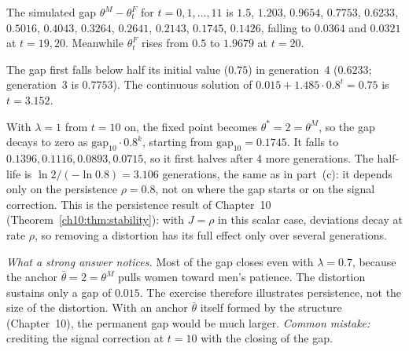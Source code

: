 \documentclass[../solutions_manual.tex]{subfiles}
\begin{document}
 The simulated gap $\theta^M - \theta^F_t$ for $t = 0, 1, \ldots, 11$ is $1.5$, $1.203$, $0.9654$, $0.7753$, $0.6233$, $0.5016$, $0.4043$, $0.3264$, $0.2641$, $0.2143$, $0.1745$, $0.1426$, falling to $0.0364$ and $0.0321$ at $t = 19, 20$. Meanwhile $\theta^F_t$ rises from $0.5$ to $1.9679$ at $t = 20$.
\begin{center}
\end{center}

 The gap first falls below half its initial value ($0.75$) in generation~4 ($0.6233$; generation~3 is $0.7753$). The continuous solution of $0.015 + 1.485\cdot0.8^t = 0.75$ is $t = 3.152$.

 With $\lambda = 1$ from $t = 10$ on, the fixed point becomes $\theta^* = 2 = \theta^M$, so the gap decays to zero as $\text{gap}_{10}\cdot0.8^{k}$, starting from $\text{gap}_{10} = 0.1745$. It falls to $0.1396, 0.1116, 0.0893, 0.0715$, so it first halves after 4 more generations. The half-life is $\ln2/(-\ln 0.8) = 3.106$ generations, the same as in part~(c): it depends only on the persistence $\rho = 0.8$, not on where the gap starts or on the signal correction. This is the persistence result of Chapter~10 (Theorem~\ref{ch10:thm:stability}): with $J = \rho$ in this scalar case, deviations decay at rate $\rho$, so removing a distortion has its full effect only over several generations.

\emph{What a strong answer notices.} Most of the gap closes even with $\lambda = 0.7$, because the anchor $\bar\theta = 2 = \theta^M$ pulls women toward men's patience. The distortion sustains only a gap of $0.015$. The exercise therefore illustrates persistence, not the size of the distortion. With an anchor $\bar\theta$ itself formed by the structure (Chapter~10), the permanent gap would be much larger. \emph{Common mistake:} crediting the signal correction at $t = 10$ with the closing of the gap.
\end{document}
